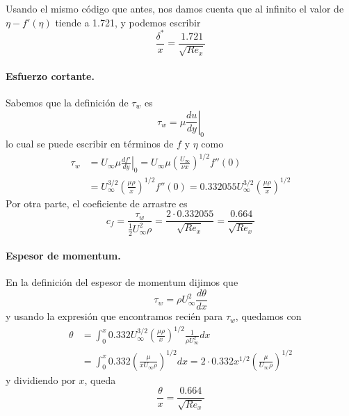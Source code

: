 Usando el mismo código que antes, nos damos cuenta que al infinito el valor de $\eta-f'(\eta)$ tiende a 1.721, y podemos escribir
%
\begin{equation}
\frac{\delta^*}{x} = \frac{1.721}{\sqrt{Re_x}}
\end{equation}

\paragraph*{Esfuerzo cortante.}
Sabemos que la definición de $\tau_w$ es
%
\begin{equation}
\tau_w = \left.\mu\frac{du}{dy}\right|_0
\end{equation}
%
lo cual se puede escribir en términos de $f$ y $\eta$ como
%
\begin{align}
\tau_w &= \left. U_\infty\mu \frac{df'}{dy}\right|_0 = U_\infty\mu \left(\frac{U_\infty}{\nu x}\right)^{1/2}f''(0) \nonumber\\
&= U_\infty^{3/2}\left(\frac{\mu\rho}{x}\right)^{1/2}f''(0) = 0.332055 U_\infty^{3/2}\left(\frac{\mu\rho}{x}\right)^{1/2} 
\end{align}
%
Por otra parte, el coeficiente de arrastre es
%
\begin{equation}
c_f = \frac{\tau_w}{\frac{1}{2}U_\infty^2\rho} = \frac{2\cdot0.332055}{\sqrt{Re_x}} = \frac{0.664}{\sqrt{Re_x}}
\end{equation}

\paragraph*{Espesor de momentum.}
En la definición del espesor de momentum dijimos que
%
\begin{equation}
\tau_w = \rho U_\infty^2 \frac{d\theta}{dx}
\end{equation}
%
y usando la expresión que encontramos recién para $\tau_w$, quedamos con
%
\begin{align}
\theta &= \int_0^x 0.332 U_\infty^{3/2}\left(\frac{\mu\rho}{x}\right)^{1/2} \frac{1}{\rho U_\infty^2} dx \nonumber\\
&= \int_0^x 0.332 \left(\frac{\mu}{xU_\infty\rho}\right)^{1/2} dx = 2\cdot0.332 x^{1/2}\left(\frac{\mu}{U_\infty\rho}\right)^{1/2}
\end{align}
%
y dividiendo por $x$, queda
%
\begin{equation}
\frac{\theta}{x} = \frac{0.664}{\sqrt{Re_x}}
\end{equation}
